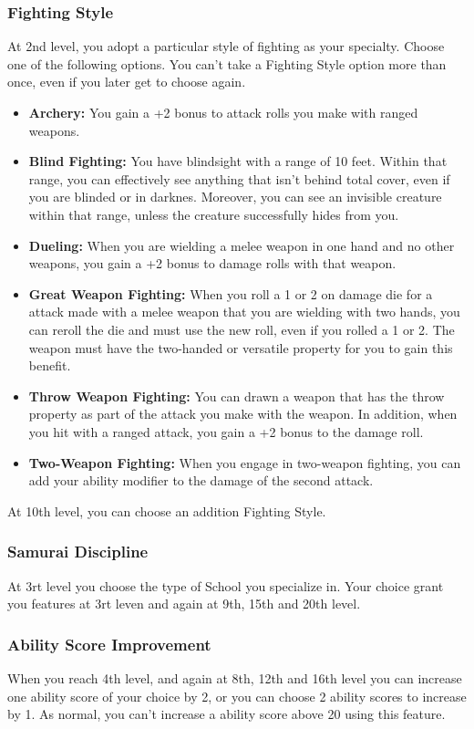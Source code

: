 \documentclass[letterpaper,twocolumn,openany,nodeprecatedcode]{dndbook}
\begin{document}
\subsubsection{Fighting Style}
At 2nd level, you adopt a particular style of fighting as your specialty. Choose one of the following options. You can't 
take a Fighting Style option more than once, even if you later get to choose again.
\vspace{\baselineskip}
\begin{itemize}
    \item \textbf{Archery:} You gain a +2 bonus to attack rolls you make with ranged weapons.
    \item \textbf{Blind Fighting:} You have blindsight with a range of 10 feet. Within that range, you can effectively see
    anything that isn't behind total cover, even if you are blinded or in darknes. Moreover, you can see an invisible creature
    within that range, unless the creature successfully hides from you.
    \item \textbf{Dueling:} When you are wielding a melee weapon in one hand and no other weapons, you gain a +2 bonus to damage
    rolls with that weapon.
    \item \textbf{Great Weapon Fighting:} When you roll a 1 or 2 on damage die for a attack made with a melee weapon that you are 
    wielding with two hands, you can reroll the die and must use the new roll, even if you rolled a 1 or 2. The weapon must have 
    the two-handed or versatile property for you to gain this benefit.
    \item \textbf{Throw Weapon Fighting:} You can drawn a weapon that has the throw property as part of the attack you make with 
    the weapon. In addition, when you hit with a ranged attack, you gain a +2 bonus to the damage roll.
    \item \textbf{Two-Weapon Fighting:} When you engage in two-weapon fighting, you can add your ability modifier to the damage of 
    the second attack.
\end{itemize}
\noindent At 10th level, you can choose an addition Fighting Style.

\subsubsection{Samurai Discipline}
At 3rt level you choose the type of School you specialize in. Your choice grant you features at 3rt leven and again at 9th, 15th and 20th level.

\subsubsection{Ability Score Improvement}
When you reach 4th level, and again at 8th, 12th and 16th level you can increase one ability score of your choice by 2, or you can choose 2 ability 
scores to increase by 1. As normal, you can't increase a ability score above 20 using this feature.
\end{document}
